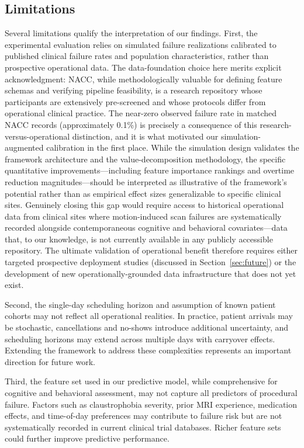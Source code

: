 \documentclass[11pt,a4paper]{article}
\begin{document}
\subsection{Limitations}
\label{sec:limitations}

Several limitations qualify the interpretation of our findings. First, the experimental evaluation relies on simulated failure realizations calibrated to published clinical failure rates and population characteristics, rather than prospective operational data. The data-foundation choice here merits explicit acknowledgment: NACC, while methodologically valuable for defining feature schemas and verifying pipeline feasibility, is a research repository whose participants are extensively pre-screened and whose protocols differ from operational clinical practice. The near-zero observed failure rate in matched NACC records (approximately 0.1\%) is precisely a consequence of this research-versus-operational distinction, and it is what motivated our simulation-augmented calibration in the first place. While the simulation design validates the framework architecture and the value-decomposition methodology, the specific quantitative improvements---including feature importance rankings and overtime reduction magnitudes---should be interpreted as illustrative of the framework's potential rather than as empirical effect sizes generalizable to specific clinical sites. Genuinely closing this gap would require access to historical operational data from clinical sites where motion-induced scan failures are systematically recorded alongside contemporaneous cognitive and behavioral covariates---data that, to our knowledge, is not currently available in any publicly accessible repository. The ultimate validation of operational benefit therefore requires either targeted prospective deployment studies (discussed in Section~\ref{sec:future}) or the development of new operationally-grounded data infrastructure that does not yet exist.

Second, the single-day scheduling horizon and assumption of known patient cohorts may not reflect all operational realities. In practice, patient arrivals may be stochastic, cancellations and no-shows introduce additional uncertainty, and scheduling horizons may extend across multiple days with carryover effects. Extending the framework to address these complexities represents an important direction for future work.

Third, the feature set used in our predictive model, while comprehensive for cognitive and behavioral assessment, may not capture all predictors of procedural failure. Factors such as claustrophobia severity, prior MRI experience, medication effects, and time-of-day preferences may contribute to failure risk but are not systematically recorded in current clinical trial databases. Richer feature sets could further improve predictive performance.
\end{document}
